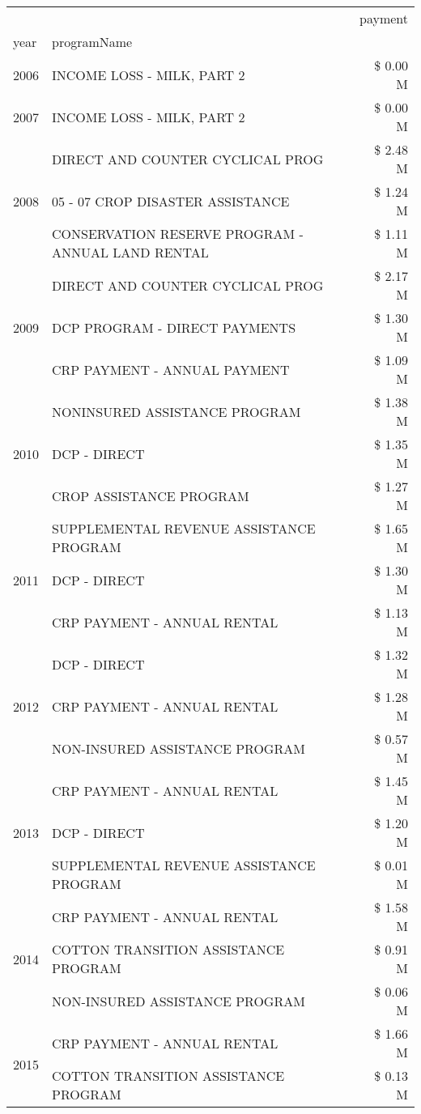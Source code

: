 \begin{tabular}{llr}
\toprule
 &  & payment \\
year & programName &  \\
\midrule
2006 & INCOME LOSS - MILK, PART 2 & \$ 0.00 M \\
\cline{1-3}
2007 & INCOME LOSS - MILK, PART 2 & \$ 0.00 M \\
\cline{1-3}
\multirow[t]{3}{*}{2008} & DIRECT AND COUNTER CYCLICAL PROG & \$ 2.48 M \\
 & 05 - 07 CROP DISASTER ASSISTANCE & \$ 1.24 M \\
 & CONSERVATION RESERVE PROGRAM - ANNUAL LAND RENTAL & \$ 1.11 M \\
\cline{1-3}
\multirow[t]{3}{*}{2009} & DIRECT AND COUNTER CYCLICAL PROG & \$ 2.17 M \\
 & DCP PROGRAM - DIRECT PAYMENTS & \$ 1.30 M \\
 & CRP PAYMENT - ANNUAL PAYMENT & \$ 1.09 M \\
\cline{1-3}
\multirow[t]{3}{*}{2010} & NONINSURED ASSISTANCE PROGRAM & \$ 1.38 M \\
 & DCP - DIRECT & \$ 1.35 M \\
 & CROP ASSISTANCE PROGRAM & \$ 1.27 M \\
\cline{1-3}
\multirow[t]{3}{*}{2011} & SUPPLEMENTAL REVENUE ASSISTANCE PROGRAM & \$ 1.65 M \\
 & DCP - DIRECT & \$ 1.30 M \\
 & CRP PAYMENT - ANNUAL RENTAL & \$ 1.13 M \\
\cline{1-3}
\multirow[t]{3}{*}{2012} & DCP - DIRECT & \$ 1.32 M \\
 & CRP PAYMENT - ANNUAL RENTAL & \$ 1.28 M \\
 & NON-INSURED ASSISTANCE PROGRAM & \$ 0.57 M \\
\cline{1-3}
\multirow[t]{3}{*}{2013} & CRP PAYMENT - ANNUAL RENTAL & \$ 1.45 M \\
 & DCP - DIRECT & \$ 1.20 M \\
 & SUPPLEMENTAL REVENUE ASSISTANCE PROGRAM & \$ 0.01 M \\
\cline{1-3}
\multirow[t]{3}{*}{2014} & CRP PAYMENT - ANNUAL RENTAL & \$ 1.58 M \\
 & COTTON TRANSITION ASSISTANCE PROGRAM & \$ 0.91 M \\
 & NON-INSURED ASSISTANCE PROGRAM & \$ 0.06 M \\
\cline{1-3}
\multirow[t]{3}{*}{2015} & CRP PAYMENT - ANNUAL RENTAL & \$ 1.66 M \\
 & COTTON TRANSITION ASSISTANCE PROGRAM & \$ 0.13 M \\

\end{tabular}
